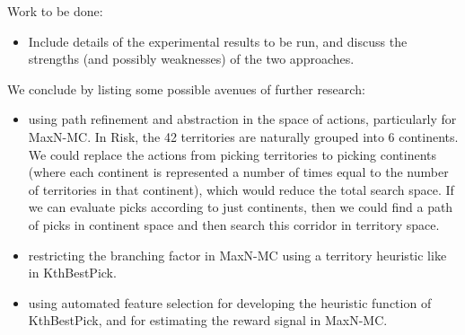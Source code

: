 \documentclass[letterpaper]{article}
\numberwithin{equation}{section}
\numberwithin{theorem}{section}
\numberwithin{lemma}{section}
\numberwithin{df}{section}
\begin{document}
Work to be done:
\begin{itemize}
	\item Include details of the experimental results to be run, and discuss the strengths (and possibly weaknesses) of the two approaches.
\end{itemize}

We conclude by listing some possible avenues of further research:
\begin{itemize}
	\item using path refinement and abstraction in the space of actions, particularly for MaxN-MC.  In Risk, the 42 territories are naturally grouped into 6 continents.  We could replace the actions from picking territories to picking continents (where each continent is represented a number of times equal to the number of territories in that continent), which would reduce the total search space.  If we can evaluate picks according to just continents, then we could find a path of picks in continent space and then search this corridor in territory space.
	\item restricting the branching factor in MaxN-MC using a territory heuristic like in KthBestPick.
	\item using automated feature selection for developing the heuristic function of KthBestPick, and for estimating the reward signal in MaxN-MC.
\end{itemize}

%
%

%
%


\end{document}
